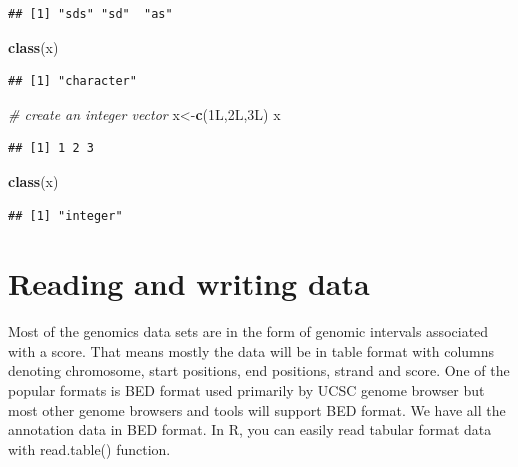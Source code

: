 \documentclass[12pt,]{krantz}
\newenvironment{Shaded}{\begin{snugshade}}{\end{snugshade}}
\newcommand{\CommentTok}[1]{\textcolor[rgb]{0.56,0.35,0.01}{\textit{#1}}}
\newcommand{\KeywordTok}[1]{\textcolor[rgb]{0.13,0.29,0.53}{\textbf{#1}}}
\newcommand{\NormalTok}[1]{#1}
\begin{document}
\begin{verbatim}
## [1] "sds" "sd"  "as"
\end{verbatim}

\begin{Shaded}
\begin{Highlighting}[]
\KeywordTok{class}\NormalTok{(x)}
\end{Highlighting}
\end{Shaded}

\begin{verbatim}
## [1] "character"
\end{verbatim}

\begin{Shaded}
\begin{Highlighting}[]
\CommentTok{# create an integer vector}
\NormalTok{x<-}\KeywordTok{c}\NormalTok{(1L,2L,3L)}
\NormalTok{x}
\end{Highlighting}
\end{Shaded}

\begin{verbatim}
## [1] 1 2 3
\end{verbatim}

\begin{Shaded}
\begin{Highlighting}[]
\KeywordTok{class}\NormalTok{(x)}
\end{Highlighting}
\end{Shaded}

\begin{verbatim}
## [1] "integer"
\end{verbatim}

\hypertarget{reading-and-writing-data}{%
\section{Reading and writing data}\label{reading-and-writing-data}}

Most of the genomics data sets are in the form of genomic intervals associated with a score. That means mostly the data will be in table format with columns denoting chromosome, start positions, end positions, strand and score. One of the popular formats is BED format used primarily by UCSC genome browser but most other genome browsers and tools will support BED format. We have all the annotation data in BED format. In R, you can easily read tabular format data with read.table() function.
\end{document}

